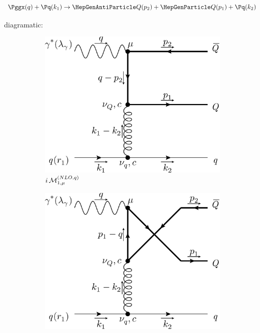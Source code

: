 \begin{equation}
\Pggx(q) + \Pq(k_1) \rightarrow \PaQ(p_2) + \PQ(p_1) + \Pq(k_2)
\end{equation}

diagramatic:
\begin{figure}[ht!]
	\centering
	\begin{subfigure}[t]{.4\textwidth}
		\includegraphics[width=\textwidth]{pyfeyn/nlo-q-a}
		\caption{$i\operatorname{\mathcal M}^{(NLO,q)}_{1,\mu}$}
	\end{subfigure}\hspace{.15\textwidth}%
	\begin{subfigure}[t]{.4\textwidth}
		\includegraphics[width=\textwidth]{pyfeyn/nlo-q-b}

\end{subfigure}
\end{figure}
